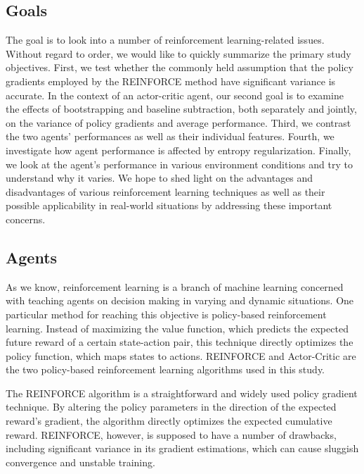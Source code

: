 \documentclass{article}
\begin{document}
\subsection{Goals}
\label{I-Goals}
The goal is to look into a number of reinforcement learning-related issues.
Without regard to order, we would like to quickly summarize the primary study objectives.
First, we test whether the commonly held assumption that the policy gradients employed by the REINFORCE method have significant variance is accurate. \cite{RL_book} %
In the context of an actor-critic agent, our second goal is to examine the effects of bootstrapping and baseline subtraction, both separately and jointly, on the variance of policy gradients and average performance.
Third, we contrast the two agents' performances as well as their individual features.
Fourth, we investigate how agent performance is affected by entropy regularization.
Finally, we look at the agent's performance in various environment conditions and try to understand why it varies. 
We hope to shed light on the advantages and disadvantages of various reinforcement learning techniques as well as their possible applicability in real-world situations by addressing these important concerns.

\subsection{Agents}
\label{I-Agents}
As we know, reinforcement learning is a branch of machine learning concerned with teaching agents on decision making in varying and dynamic situations.
One particular method for reaching this objective is policy-based reinforcement learning. 
Instead of maximizing the value function, which predicts the expected future reward of a certain state-action pair, this technique directly optimizes the policy function, which maps states to actions. 
REINFORCE and Actor-Critic are the two policy-based reinforcement learning algorithms used in this study.

The REINFORCE algorithm is a straightforward and widely used policy gradient technique.
By altering the policy parameters in the direction of the expected reward's gradient, the algorithm directly optimizes the expected cumulative reward.
REINFORCE, however, is supposed to have a number of drawbacks, including significant variance in its gradient estimations, which can cause sluggish convergence and unstable training.
\end{document}
